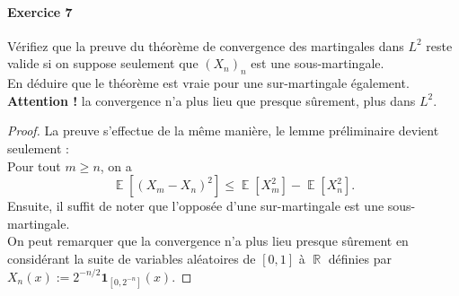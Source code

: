 \documentclass{article}
\theoremstyle{definition}
\numberwithin{equation}{section}
\DeclareMathOperator{\R}{\mathbb{R}}
\DeclareMathOperator{\E}{\mathbb{E}}
\begin{document}
\paragraph{Exercice 7} Vérifiez que la preuve du théorème de convergence des martingales dans $L^2$ reste valide si on suppose seulement que $(X_n)_n$ est une sous-martingale.\\
En déduire que le théorème est vraie pour une sur-martingale également.\\
\textbf{Attention !} la convergence n'a plus lieu que presque sûrement, plus dans $L^2$.

\begin{proof}
La preuve s'effectue de la même manière, le lemme préliminaire devient seulement :\\
Pour tout $m\geq n$, on a 
$$\E[(X_m-X_n)^2]\leq \E[X_m^2]-\E[X_n^2].$$
Ensuite, il suffit de noter que l'opposée d'une sur-martingale est une sous-martingale.\\
On peut remarquer que la convergence n'a plus lieu presque sûrement en considérant la suite de variables aléatoires de $[0,1]$ à $\R$ définies par $X_n(x) := 2^{-n/2}\mathbf{1}_{[0,2^{-n}]}(x)$.
\end{proof}
\end{document}
